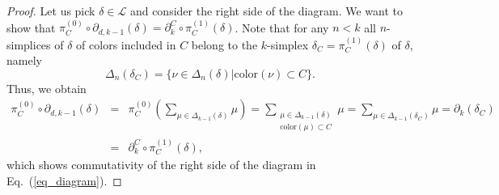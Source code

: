 \documentclass[onecolumn,letterpaper,11pt,accepted=2022-12-19]{quantumarticle}
\newcommand{\face}[2]{{\Delta_{#1}(#2)}}
\newcommand{\bnd}[2]{\partial_{#1,#2}}
\newcommand{\col}[1]{{\mathrm{color}(#1)}}
\theoremstyle{definition}
\theoremstyle{lemma}
\theoremstyle{theorem}
\theoremstyle{corollary}
\begin{document}
{\begin{proof}

Let us pick $\delta\in\mathcal{L}$ and consider the right side of the diagram.
We want to show that $\pi^{(0)}_C \circ \bnd{d}{k-1} (\delta) = \partial_{k}^C  \circ \pi^{(1)}_C (\delta)$.
Note that for any $n<k$ all $n$-simplices of $\delta$ of colors included in $C$ belong to the $k$-simplex $\delta_C = \pi_C^{(1)}(\delta)$ of $\delta$, namely
\begin{equation}
\face{n}{\delta_C} = \{ \nu \in\face{n}{\delta} | \col{\nu} \subset C\}.
\end{equation}
Thus, we obtain
\begin{eqnarray}
\pi^{(0)}_C \circ \bnd{d}{k-1} (\delta) &=&
\pi^{(0)}_C \left(\sum_{\mu\in\face{k-1}{\delta}} \mu \right) = 
\sum_{\substack{\mu\in\face{k-1}{\delta} \\ \col{\mu}\subset C}} \mu = 
\sum_{\mu\in\face{k-1}{\delta_C}} \mu = \partial_{k} (\delta_C)\\
&=& \partial_{k}^C  \circ \pi^{(1)}_C (\delta),
\end{eqnarray}
which shows commutativity of the right side of the diagram in Eq.~(\ref{eq_diagram}).



\end{proof}}
\end{document}
